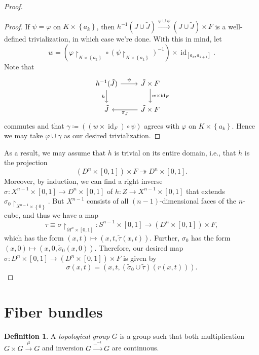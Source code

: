 \documentclass[10pt,letterpaper,cm]{nupset}
\theoremstyle{definition}
\newtheorem{defn}{Definition}[subsection]
\theoremstyle{theorem}
\theoremstyle{remark}
\newcommand{\1}{\mathbb{1}}
\newcommand{\0}{\vec 0}
\DeclareMathOperator{\id}{id}
\begin{document}
\begin{proof}
\begin{proof}
If $\psi =\varphi$ on $K\times \left\{a_k\right\}$, then $h^{-1}(J\cup \tilde{J}) \overset{\varphi \cup \psi}{\longrightarrow} \left(J \cup \tilde{J}\right) \times F$ is a well-defined trivialization, in which case we're done. With this in mind, let
\[
w = \left(\varphi\restriction_{K\times \left\{a_k\right\}} \circ \left(\psi\restriction_{K\times \left\{a_k\right\}}\right)^{-1}\right) \times \id_{\left[a_k, a_{k+1}\right]}
.\]
Note that 
\[
\begin{tikzcd}
h^{-1}(\tilde{J}) \arrow[r, "\psi"] \arrow[d, "h"'] & \tilde{J}\times F \arrow[d, "w \times \id_F"]               \\
\tilde{J}                                           & \tilde{J}\times F \arrow[l, "\pi_{\tilde{J}}"]
\end{tikzcd}
\] commutes and that $\gamma \coloneqq \left(\left(w \times \id_F\right) \circ \psi\right)$ agrees with $\varphi$ on $K\times \left\{a_k\right\}$. Hence we may take $\varphi \cup \gamma$ as our desired trivialization.
\end{proof}
As a result, we may assume that $h$ is trivial on its entire domain, i.e., that $h$ is the projection $$\left(D^n \times \left[0,1\right]\right) \times F \twoheadrightarrow D^n \times \left[0,1\right].$$ Moreover, by induction, we can find a right inverse $\sigma : X^{n-1} \times \left[0,1\right] \to D^n \times \left[0,1\right]$ of $h : Z \to X^{n-1} \times \left[0,1\right]$ that extends $\sigma_0\restriction_{X^{n-1}\times \left\{0\right\}}$. But $X^{n-1}$ consists of all $\left(n-1\right)$-dimensional faces of the $n$-cube, and thus we have a map $$\tau \equiv \sigma \restriction_{\partial{I^n} \times \left[0,1\right]} : S^{n-1} \times  \left[0,1\right]   \to  \left(D^n \times \left[0,1\right]\right) \times F,$$ which has the form $\left(x,t\right) \mapsto \left(x,t,\tilde{\tau}(x,t)\right)$. Further, $\sigma_0$ has the form $(x,0) \mapsto \left(x,0, \tilde{\sigma}_0(x,0)\right)$. Therefore, our desired map $\sigma :  D^n \times \left[0,1\right] \to \left(D^n \times \left[0,1\right]\right) \times F $  is given by 
\[
\sigma(x,t) = \left(x,t, \left(\tilde{\sigma}_0 \cup \tilde{\tau}\right)(r(x,t))\right).
\]
\end{proof}


\section{Fiber bundles}

\begin{defn}
A \textit{topological group} $G$ is a group such that both multiplication $G \times G \overset{\mu}{\longrightarrow} G$ and inversion $G \overset{{-}^{-1}}{\longrightarrow} G$ are continuous.
\end{defn}
\end{document}

